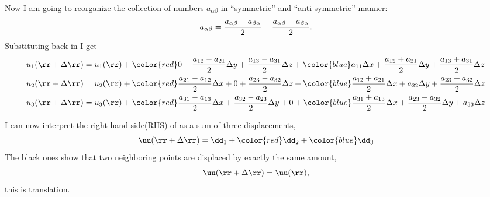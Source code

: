 \begin{fullwidth}
Now I am going to reorganize the collection of numbers
$a_{\alpha\beta}$ in ``symmetric'' and ``anti-symmetric'' manner: 
\begin{equation}
a_{\alpha\beta} = \frac{a_{\alpha\beta}-a_{\beta\alpha}}{2} +
  \frac{a_{\alpha\beta}+a_{\beta\alpha}}{2}  \/.
\label{eq:break}
\end{equation}
Substituting  back in  I get
\begin{subequations}
\begin{align}
u_1(\rr+\Delta \rr) &= u_1(\rr) + 
   {\color{red}0 + \frac{a_{12}-a_{21}}{2}\Delta y +
    \frac{a_{13}-a_{31}}{2}\Delta z}  +
       {\color{blue}a_{11}\Delta x+ \frac{a_{12}+a_{21}}{2}\Delta y +
    \frac{a_{13}+a_{31}}{2}\Delta z}\\
u_2(\rr+\Delta \rr) &= u_2(\rr) + 
   {\color{red}\frac{a_{21}-a_{12}}{2}\Delta x + 0 +
    \frac{a_{23}-a_{32}}{2}\Delta z}  +
       {\color{blue}\frac{a_{12}+a_{21}}{2}\Delta x+ a_{22}\Delta y +
    \frac{a_{23}+a_{32}}{2}\Delta z}\\
u_3(\rr+\Delta \rr) &= u_3(\rr) + 
   {\color{red}\frac{a_{31}-a_{13}}{2}\Delta x +
    \frac{a_{32}-a_{23}}{2}\Delta y+ 0}  +
       {\color{blue}\frac{a_{31}+a_{13}}{2}\Delta x+ 
    \frac{a_{23}+a_{32}}{2}\Delta y + a_{33}\Delta z}
\end{align}
\label{eq:u123}
\end{subequations}
\end{fullwidth}
I can now interpret the right-hand-side(RHS) of  
as a sum of three displacements, 
\begin{equation}
\uu(\rr+\Delta \rr) = \dd_1+{\color{red}\dd_2}+{\color{blue}\dd_3}
\label{eq:disp}
\end{equation}
The black ones show that two neighboring points are
displaced by exactly the same amount, 
\begin{equation}
\uu(\rr+\Delta \rr) = \uu(\rr) \/,
\end{equation}
this is translation. 


